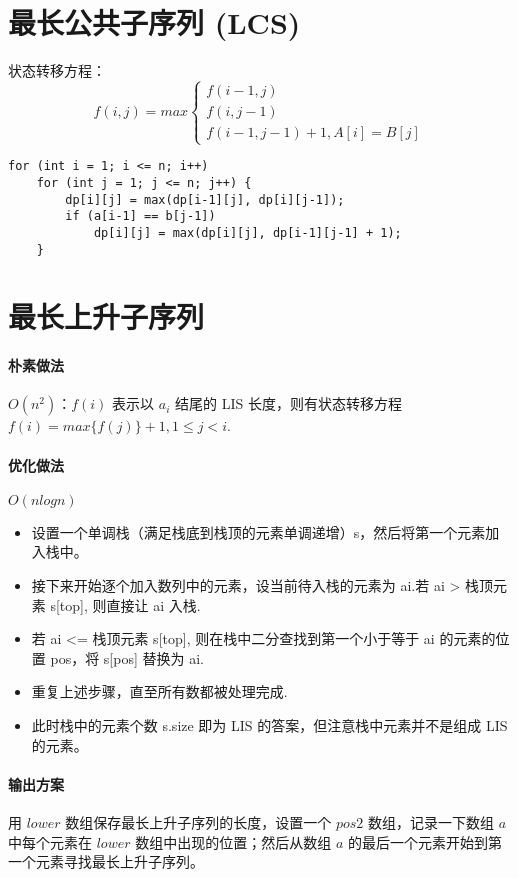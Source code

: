 \section{最长公共子序列 (LCS)}
状态转移方程：
$$f(i, j) = max\begin{cases} f(i-1, j)\\ f(i, j-1) \\ f(i-1, j-1) + 1, A[i] = B[j] \end{cases}$$

\begin{verbatim}
for (int i = 1; i <= n; i++)
    for (int j = 1; j <= n; j++) {
        dp[i][j] = max(dp[i-1][j], dp[i][j-1]);
        if (a[i-1] == b[j-1])
            dp[i][j] = max(dp[i][j], dp[i-1][j-1] + 1);
    }
\end{verbatim}

\section{最长上升子序列}
\paragraph{朴素做法} $O(n^2)$：$f(i)$ 表示以 $a_i$ 结尾的 LIS 长度，则有状态转移方程 $f(i) = max\{f(j)\} + 1, 1 \le j < i$.
\paragraph{优化做法}  $O(nlogn)$
\begin{itemize}
    \item 设置一个单调栈（满足栈底到栈顶的元素单调递增）s，然后将第一个元素加入栈中。
    \item 接下来开始逐个加入数列中的元素，设当前待入栈的元素为 ai.若 ai > 栈顶元素 s[top], 则直接让 ai 入栈.
    \item 若 ai <= 栈顶元素 s[top], 则在栈中二分查找到第一个小于等于 ai 的元素的位置 pos，将 s[pos] 替换为 ai.
    \item 重复上述步骤，直至所有数都被处理完成.
    \item 此时栈中的元素个数 s.size 即为 LIS 的答案，但注意栈中元素并不是组成 LIS 的元素。
\end{itemize}
\paragraph{输出方案} 用 $lower$ 数组保存最长上升子序列的长度，设置一个 $pos2$ 数组，记录一下数组 $a$ 中每个元素在 $lower$ 数组中出现的位置；然后从数组 $a$ 的最后一个元素开始到第一个元素寻找最长上升子序列。


